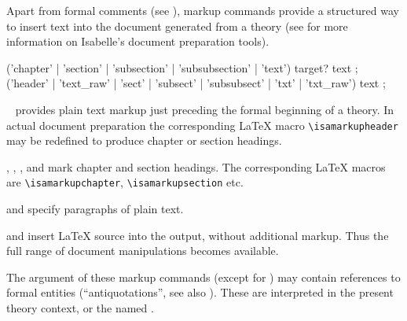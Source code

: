 \begin{isabellebody}
\begin{isamarkuptext}
  Apart from formal comments (see ), markup
  commands provide a structured way to insert text into the document
  generated from a theory (see \cite{isabelle-sys} for more
  information on Isabelle's document preparation tools).

  \begin{rail}
    ('chapter' | 'section' | 'subsection' | 'subsubsection' | 'text') target? text
    ;
    ('header' | 'text\_raw' | 'sect' | 'subsect' | 'subsubsect' | 'txt' | 'txt\_raw') text
    ;
  \end{rail}

  \begin{descr}

  \item [\hyperlink{command.header}{\mbox{\isa{\isacommand{header}}}}~\isa{{\isachardoublequote}text{\isachardoublequote}}] provides plain text
  markup just preceding the formal beginning of a theory.  In actual
  document preparation the corresponding {\LaTeX} macro \verb|\isamarkupheader| may be redefined to produce chapter or section
  headings.
  
  \item [\hyperlink{command.chapter}{\mbox{\isa{\isacommand{chapter}}}}, \hyperlink{command.section}{\mbox{\isa{\isacommand{section}}}}, \hyperlink{command.subsection}{\mbox{\isa{\isacommand{subsection}}}}, and \hyperlink{command.subsubsection}{\mbox{\isa{\isacommand{subsubsection}}}}] mark chapter and
  section headings.  The corresponding {\LaTeX} macros are \verb|\isamarkupchapter|, \verb|\isamarkupsection| etc.

  \item [\hyperlink{command.text}{\mbox{\isa{\isacommand{text}}}} and \hyperlink{command.txt}{\mbox{\isa{\isacommand{txt}}}}] specify paragraphs of
  plain text.

  \item [\hyperlink{command.text-raw}{\mbox{\isa{\isacommand{text{\isacharunderscore}raw}}}} and \hyperlink{command.txt-raw}{\mbox{\isa{\isacommand{txt{\isacharunderscore}raw}}}}] insert
  {\LaTeX} source into the output, without additional markup.  Thus
  the full range of document manipulations becomes available.

  \end{descr}

  The  argument of these markup commands (except for
  \hyperlink{command.text-raw}{\mbox{}}) may contain references to formal entities
  (``antiquotations'', see also ).  These are
  interpreted in the present theory context, or the named .


\end{isamarkuptext}
\end{isabellebody}
